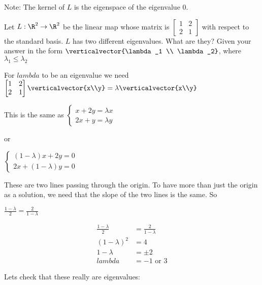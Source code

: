 \documentclass{ximera}
\begin{document}
Note: The kernel of $L$ is the eigenspace of the eigenvalue $0$.

\begin{question}
	Let $L :\R^2 \to \R^2$ be the linear map whose matrix  is \(\begin{bmatrix} 1 & 2 \\2& 1\end{bmatrix}\) with respect to the standard basis.  $L$ has two different
	eigenvalues.  What are they?  Given your answer in the form $\verticalvector{\lambda_1 \\ \lambda_2}$, where $\lambda_1 \leq \lambda_2$
	
	\begin{solution}
		\begin{hint}
			For $lambda$ to be an eigenvalue we need
			\(\begin{bmatrix} 1 & 2 \\2& 1\end{bmatrix} \verticalvector{x\\y} = \lambda \verticalvector{x\\y}\)
		\end{hint}
		\begin{hint}
			This is the same as \(\begin{cases}
			x+2y = \lambda x \\
			2x+y =\lambda y
			\end{cases}\)
			
			or
			
			 \(\begin{cases}
			(1-\lambda)x+2y = 0 \\
			2x+(1-\lambda)y =0
			\end{cases}\)
			
		\end{hint}
		\begin{hint}
			These are two lines passing through the origin.  To have more than just the origin as a solution, we need that the slope of the two lines is the same.  So
			
			\(
				\frac{1-\lambda}{2} = \frac{2}{1-\lambda}
			\)
		\end{hint}
		\begin{hint}
			\begin{align*}
				\frac{1-\lambda}{2} &= \frac{2}{1-\lambda}\\
				(1-\lambda)^2 &= 4\\
				1-\lambda &= \pm 2\\
				lambda &= -1 \text{ or } 3
			\end{align*}
		\end{hint}
		\begin{hint}
			Lets check that these really are eigenvalues:
			

\end{hint}
\end{solution}
\end{question}
\end{document}
